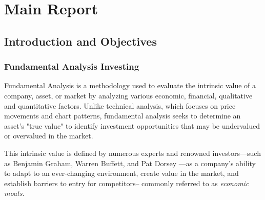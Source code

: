 \documentclass[11pt,english,a4paper,hidelinks]{book}
\begin{document}
\tableofcontents
\newpage

\listoffigures
\newpage

\listoftables
\newpage

\printglossary[type=\acronymtype, title=Acronyms]
\newpage

\clearpage
{}
\setcounter{page}{1}

\part{Main Report}

\chapter{Introduction and Objectives }
\section{Fundamental Analysis Investing}

\noindent Fundamental Analysis is a methodology used to evaluate the intrinsic value of a company, asset, or market by analyzing various economic, financial, qualitative and quantitative factors. Unlike technical analysis, which focuses on price movements and chart patterns, fundamental analysis seeks to determine an asset's "true value" to identify investment opportunities that may be undervalued or overvalued in the market.

\vspace{0.5cm}
\noindent This intrinsic value is defined by numerous experts and renowned investors—such as Benjamin Graham, Warren Buffett, and Pat Dorsey \cite{dorsey2011five}—as a company's ability to adapt to an ever-changing environment, create value in the market, and establish barriers to entry for competitors-- commonly referred to as \textit{economic moats}.
\end{document}
